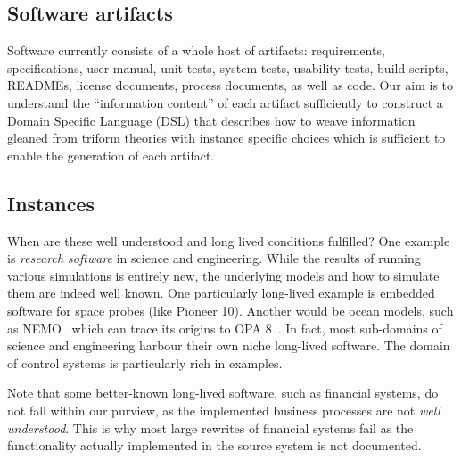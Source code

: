 \documentclass[a4paper,UKenglish,cleveref,autoref,thm-restate]{oasics-v2021}
\begin{document}
\subsection{Software artifacts}
\label{subsec:software-artifacts}

Software currently consists of a whole host of artifacts: requirements,
specifications, user manual, unit tests, system tests, usability tests, build
scripts, READMEs, license documents, process documents, as well as code.
Our aim is to understand the ``information content'' of each artifact
sufficiently to construct a Domain Specific Language (DSL) that describes how
to weave information gleaned from triform theories with instance specific
choices which is sufficient to enable the generation of each artifact.

\subsection{Instances}
\label{subsec:examples-of-context}

When are these well understood and long lived conditions fulfilled? One example
is \emph{research software} in science and engineering. While the results of
running various simulations is entirely new, the underlying models and how to
simulate them are indeed well known. One particularly long-lived example is
embedded software for space probes (like Pioneer 10). Another would be ocean
models, such as NEMO~\cite{madec_gurvan_2022_6334656} which can trace its
origins to OPA 8~\cite{Madec1998}. In fact, most sub-domains of science and
engineering harbour their own niche long-lived software. The domain of
control systems is particularly rich in examples.

Note that some better-known long-lived software, such as financial
systems, do not fall within our purview, as the implemented  business processes
are not \emph{well understood}. This is why most large rewrites of financial 
systems fail as the functionality actually implemented in the source system is
not documented.
\end{document}
